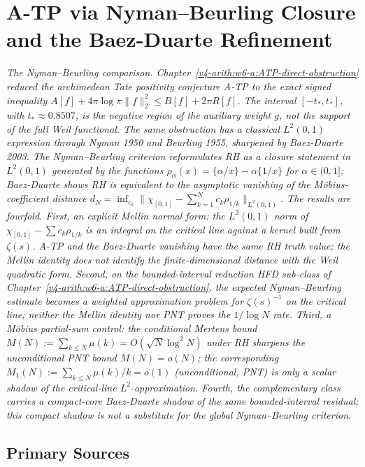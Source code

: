 \chapter{A-TP via Nyman--Beurling Closure and the Baez-Duarte Refinement}
\label{v4-arith:w7-b:chapter}

\emph{The Nyman--Beurling comparison. Chapter~\ref{v4-arith:w6-a:ATP-direct-obstruction} reduced the archimedean
Tate positivity conjecture A-TP to the exact signed inequality
\(A[f]+4\pi\log\pi\|f\|_2^2\le B[f]+2\pi R[f]\).
The interval \([-t_{\ast},t_{\ast}]\), with
\(t_{\ast}\approx0.8507\), is the negative region of the auxiliary
weight \(g\), not the support of the full Weil functional. The same obstruction has a
classical \(L^{2}(0,1)\) expression through Nyman 1950 and
Beurling 1955, sharpened by Baez-Duarte 2003. The Nyman--Beurling
criterion reformulates RH as a closure statement in \(L^{2}(0,1)\)
generated by the functions \(\rho_{\alpha}(x)=\{\alpha/x\}-\alpha\{1/x\}\)
for \(\alpha\in(0,1]\); Baez-Duarte shows RH is equivalent to the
asymptotic vanishing of the M\"{o}bius-coefficient distance
\(d_{N}=\inf_{c_{k}}\|\chi_{[0,1]}-\sum_{k=1}^{N}c_{k}\rho_{1/k}\|_{L^{2}(0,1)}\).
The results are fourfold. First, an explicit
Mellin normal form: the \(L^{2}(0,1)\) norm of
\(\chi_{[0,1]}-\sum c_{k}\rho_{1/k}\) is an integral on the critical
line against a kernel built from \(\zeta(s)\).  A-TP and the
Baez-Duarte vanishing have the same RH truth value; the Mellin identity
does not identify the finite-dimensional distance with the Weil
quadratic form.
Second, on the bounded-interval reduction HFD sub-class of
Chapter~\ref{v4-arith:w6-a:ATP-direct-obstruction}, the expected
Nyman--Beurling estimate becomes a weighted approximation problem for
\(\zeta(s)^{-1}\) on the critical line; neither the Mellin identity nor
PNT proves the \(1/\log N\) rate. Third, a M\"{o}bius partial-sum
control: the conditional Mertens bound
\(M(N):=\sum_{k\leq N}\mu(k)=O(\sqrt{N}\log^{2}N)\) under RH
sharpens the unconditional PNT bound \(M(N)=o(N)\); the
corresponding \(M_{1}(N):=\sum_{k\leq N}\mu(k)/k=o(1)\)
(unconditional, PNT) is only a scalar shadow of the critical-line
\(L^{2}\)-approximation. Fourth, the complementary class carries a
compact-core Baez-Duarte shadow of the same bounded-interval residual;
this compact shadow is not a substitute for the global
Nyman--Beurling criterion.}

\section{Primary Sources}
\label{v4-arith:w7-b:sources}

